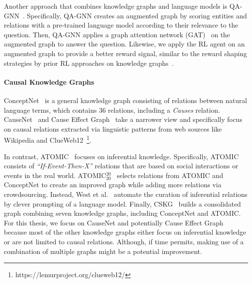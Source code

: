 Another approach that combines knowledge graphs and language models is QA-GNN~\cite{Yasunaga2021QAGNN}.
Specifically, QA-GNN creates an augmented graph by scoring entities and relations with a pre-trained language model according to their relevance to the question. Then, QA-GNN applies a graph attention network (GAT)~\cite{Velickovic2018GAT} on the augmented graph to answer the question. Likewise, we apply the RL agent on an augmented graph to provide a better reward signal, similar to the reward shaping strategies by prior RL approaches on knowledge graphs~\cite{Lin2020RewardShaping, Qiu2020Stepwise}.



\paragraph{Causal Knowledge Graphs}
ConceptNet~\cite{Speer2017ConceptNet} is a general knowledge graph consisting of relations between natural language terms, which contains 36 relations, including a \textit{Causes} relation. CauseNet~\cite{Heindorf2020Causenet} and Cause Effect Graph~\cite{Li2020CauseEffectGraph} take a narrower view and specifically focus on causal relations extracted via linguistic patterns from web sources like Wikipedia and ClueWeb12~\footnote{https://lemurproject.org/clueweb12/}. 

In contrast, ATOMIC~\cite{Sap2019ATOMIC} focuses on inferential knowledge. Specifically, ATOMIC consists of \textit{``If-Event-Then-X''} relations that are based on social interactions or events in the real world. ATOMIC$^{20}_{20}$~\cite{Hwang2021COMET} selects relations from ATOMIC and ConceptNet to create an improved graph while adding more relations via crowdsourcing. Instead, West et al.~\cite{West2021Symbolic} automate the curation of inferential relations by clever prompting of a language model. Finally, CSKG~\cite{Ilievski2021CSKG} builds a consolidated graph combining seven knowledge graphs, including ConceptNet and ATOMIC.
For this thesis, we focus on CauseNet and potentially Cause Effect Graph because most of the other knowledge graphs either focus on inferential knowledge or are not limited to causal relations. Although, if time permits, making use of a combination of multiple graphs might be a potential improvement.

